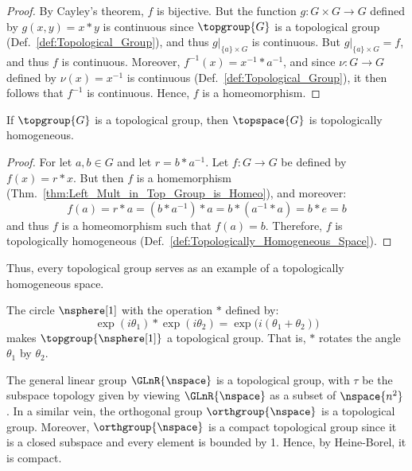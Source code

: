 \documentclass{article}                                                        %
\begin{document}
        \begin{proof}
            By Cayley's theorem, $f$ is bijective. But the function
            $g:G\times{G}\rightarrow{G}$ defined by $g(x,y)=x*y$ is continuous
            since $\topgroup{G}$ is a topological group
            (Def.~\ref{def:Topological_Group}), and thus
            $g|_{\{a\}\times{G}}$ is continuous. But
            $g|_{\{a\}\times{G}}=f$, and thus $f$ is continuous. Moreover,
            $f^{\minus{1}}(x)=x^{\minus{1}}*a^{\minus{1}}$, and since
            $\nu:G\rightarrow{G}$ defined by $\nu(x)=x^{\minus{1}}$ is
            continuous (Def.~\ref{def:Topological_Group}), it then follows that
            $f^{\minus{1}}$ is continuous. Hence, $f$ is a homeomorphism.
        \end{proof}
        \begin{theorem}
            \label{thm:Top_Groups_are_Homogeneous}%
            If $\topgroup{G}$ is a topological group, then $\topspace{G}$ is
            topologically homogeneous.
        \end{theorem}
        \begin{proof}
            For let $a,b\in{G}$ and let $r=b*a^{\minus{1}}$. Let
            $f:G\rightarrow{G}$ be defined by $f(x)=r*x$. But then $f$ is a
            homemorphism (Thm.~\ref{thm:Left_Mult_in_Top_Group_is_Homeo}), and
            moreover:
            \begin{equation}
                f(a)=r*a=(b*a^{\minus{1}})*a=b*(a^{\minus{1}}*a)=b*e=b
            \end{equation}
            and thus $f$ is a homeomorphism such that $f(a)=b$. Therefore, $f$
            is topologically homogeneous
            (Def.~\ref{def:Topologically_Homogeneous_Space}).
        \end{proof}
        Thus, every topological group serves as an example of a topologically
        homogeneous space.
        \begin{example}
            The circle $\nsphere[1]$ with the operation $*$ defined by:
            \begin{equation}
                \exp(i\theta_{1})*\exp(i\theta_{2})=
                \exp\big(i(\theta_{1}+\theta_{2})\big)
            \end{equation}
            makes $\topgroup{\nsphere[1]}$ a topological group. That is,
            $*$ rotates the angle $\theta_{1}$ by $\theta_{2}$.
        \end{example}
        \begin{example}
            The general linear group $\GLnR{\nspace}$ is a topological group,
            with $\tau$ be the subspace topology given by viewing
            $\GLnR{\nspace}$ as a subset of $\nspace{n^{2}}$. In a similar vein,
            the orthogonal group $\orthgroup{\nspace}$ is a topological group.
            Moreover, $\orthgroup{\nspace}$ is a compact topological group since
            it is a closed subspace and every element is bounded by 1. Hence,
            by Heine-Borel, it is compact.
        \end{example}
\end{document}
